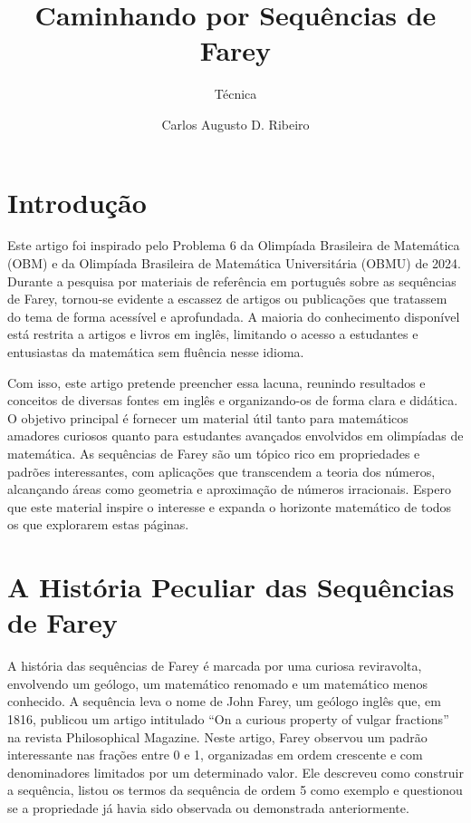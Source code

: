 \documentclass{hipatia}
\title{ \fontsize{28}{28}\selectfont Caminhando por Sequências de Farey}
\subtitle{Técnica}
\author{Carlos Augusto D. Ribeiro}
\theoremstyle{definition} %
\begin{document}
\setcounter{page}{\tecnicapage}
\maketitle

\section{Introdução}

Este artigo foi inspirado pelo Problema 6 da Olimpíada Brasileira de Matemática (OBM) e da Olimpíada Brasileira de Matemática Universitária (OBMU) de 2024. Durante a pesquisa por materiais de referência em português sobre as sequências de Farey, tornou-se evidente a escassez de artigos ou publicações que tratassem do tema de forma acessível e aprofundada. A maioria do conhecimento disponível está restrita a artigos e livros em inglês, limitando o acesso a estudantes e entusiastas da matemática sem fluência nesse idioma.

Com isso, este artigo pretende preencher essa lacuna, reunindo resultados e conceitos de diversas fontes em inglês e organizando-os de forma clara e didática. O objetivo principal é fornecer um material útil tanto para matemáticos amadores curiosos quanto para estudantes avançados envolvidos em olimpíadas de matemática. As sequências de Farey são um tópico rico em propriedades e padrões interessantes, com aplicações que transcendem a teoria dos números, alcançando áreas como geometria e aproximação de números irracionais. Espero que este material inspire o interesse e expanda o horizonte matemático de todos os que explorarem estas páginas.

\section{A História Peculiar das Sequências de Farey}
A história das sequências de Farey é marcada por uma curiosa reviravolta, envolvendo um geólogo, um matemático renomado e um matemático menos conhecido. A sequência leva o nome de John Farey, um geólogo inglês que, em 1816, publicou um artigo intitulado ``On a curious property of vulgar fractions'' na revista Philosophical Magazine. Neste artigo, Farey observou um padrão interessante nas frações entre 0 e 1, organizadas em ordem crescente e com denominadores limitados por um determinado valor. Ele descreveu como construir a sequência, listou os termos da sequência de ordem 5 como exemplo e questionou se a propriedade já havia sido observada ou demonstrada anteriormente.
\end{document}
